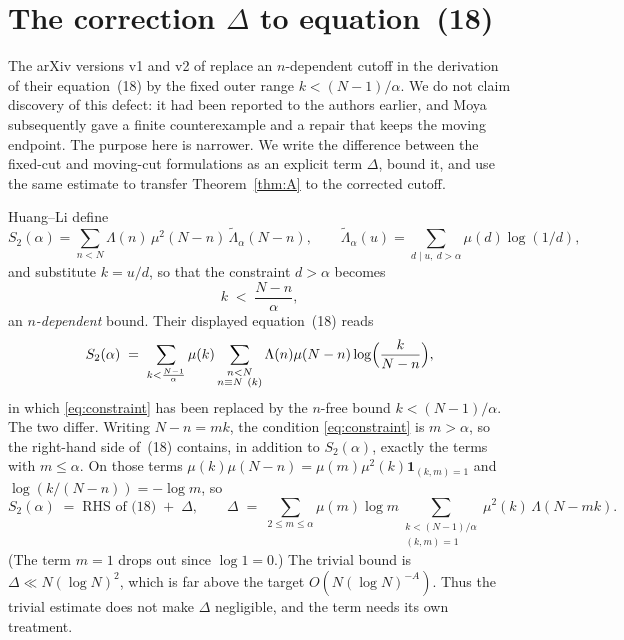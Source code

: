 \documentclass[11pt,a4paper]{article}
\theoremstyle{plain}
\theoremstyle{definition}
\theoremstyle{remark}
\begin{document}
\section{The correction \texorpdfstring{$\Delta$}{Delta} to
equation~(18)}\label{sec:delta}

The arXiv versions v1 and v2 of \cite{HL} replace an
$n$-dependent cutoff in the derivation of their equation~(18) by the
fixed outer range $k<(N-1)/\alpha$.  We do not claim discovery of this
defect: it had been reported to the authors earlier, and Moya
\cite{Moya} subsequently gave a finite counterexample and a repair that
keeps the moving endpoint.  The purpose here is narrower.  We write the
difference between the fixed-cut and moving-cut formulations as an
explicit term $\Delta$, bound it, and use the same estimate to transfer
Theorem~\ref{thm:A} to the corrected cutoff.

Huang--Li define
\[
  S_2(\alpha)=\sum_{n<N}\Lambda(n)\,\mu^2(N-n)\,
     \tilde\Lambda_\alpha(N-n),
  \qquad
  \tilde\Lambda_\alpha(u)=\sum_{d\mid u,\ d>\alpha}\mu(d)\log(1/d),
\]
and substitute $k=u/d$, so that the constraint $d>\alpha$ becomes
\begin{equation}\label{eq:constraint}
  k\;<\;\frac{N-n}{\alpha},
\end{equation}
an \emph{$n$-dependent} bound. Their displayed equation~(18) reads
\[
  S_2(\alpha)\;=\;\sum_{k<\frac{N-1}{\alpha}}\mu(k)
    \sum_{\substack{n<N\\ n\equiv N\ (k)}}
    \Lambda(n)\mu(N-n)\log\Bigl(\frac{k}{N-n}\Bigr),
\]
in which \eqref{eq:constraint} has been replaced by the $n$-free bound
$k<(N-1)/\alpha$. The two differ. Writing $N-n=mk$, the condition
\eqref{eq:constraint} is $m>\alpha$, so the right-hand side of~(18)
contains, in addition to $S_2(\alpha)$, exactly the terms with
$m\le\alpha$. On those terms
$\mu(k)\mu(N-n)=\mu(m)\mu^2(k)\mathbf 1_{(k,m)=1}$ and
$\log(k/(N-n))=-\log m$, so
\begin{equation}\label{eq:Delta}
  S_2(\alpha)\;=\;\text{RHS of (18)}\;+\;\Delta,
  \qquad
  \Delta\;=\;\sum_{2\le m\le\alpha}\mu(m)\log m
    \sum_{\substack{k<(N-1)/\alpha\\ (k,m)=1}}\mu^2(k)\,\Lambda(N-mk).
\end{equation}
(The term $m=1$ drops out since $\log1=0$.) The trivial bound is
$\Delta\ll N(\log N)^2$, which is far above the target
$O(N(\log N)^{-A})$.  Thus the trivial estimate does not make
$\Delta$ negligible, and the term needs its own treatment.
\end{document}
